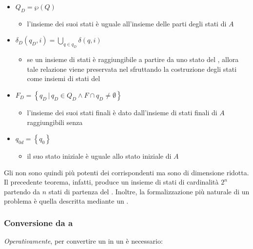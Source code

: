 \documentclass[italian, 10pt]{article}
\begin{document}
\begin{itemize}
  \item \(Q_D = \wp(Q)\)
        \begin{itemize}[label=\(\rightarrow\)]
          \item l'insieme dei suoi stati è uguale all'insieme delle parti degli stati di \(A\)
        \end{itemize}
  \item \(\displaystyle \delta_D(q_D, i) = \bigcup_{q \in q_D} \delta(q, i) \)
        \begin{itemize}[label=\(\rightarrow\)]
          \item se un insieme di stati è raggiungibile a partire da uno stato del \NFA, allora tale relazione viene preservata nel \DFA sfruttando la costruzione degli stati come insiemi di stati del \NFA
        \end{itemize}
  \item \(F_D = \left\{q_D \, | \, q_D \in Q_D \land F \cap q_D \neq \emptyset \right\}\)
        \begin{itemize}[label=\(\rightarrow\)]
          \item l'insieme dei suoi stati finali è dato dall'insieme di stati finali di \(A\) raggiungibili senza \ND
        \end{itemize}
  \item \(q_{0d} = \left\{q_0\right\}\)
        \begin{itemize}[label=\(\rightarrow\)]
          \item il suo stato iniziale è uguale allo stato iniziale di \(A\)
        \end{itemize}
\end{itemize}

Gli \NFA non sono quindi più potenti dei corrispondenti \DFA ma sono di dimensione ridotta.
Il precedente teorema, infatti, produce un insieme di stati di cardinalità \(2^n\) partendo da \(n\) stati di partenza del \NFA.
Inoltre, la formalizzazione più naturale di un problema è quella descritta mediante un \NFA.

\subsubsection{Conversione da \NFA a \DFA}
\label{sec:conversione-nfa-dfa}

\textit{Operativamente}, per convertire un \FSA in un \DFA è necessario:
\end{document}
